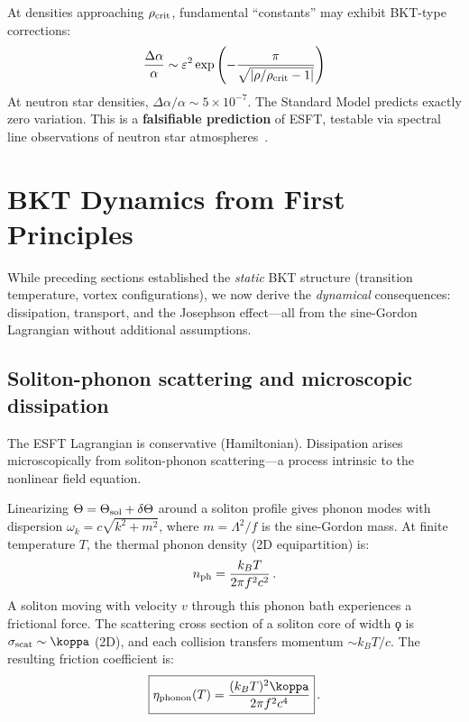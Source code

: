 ﻿\documentclass[twocolumn,showpacs,preprintnumbers,amsmath,amssymb,prd]{revtex4-2}
\begin{document}
At densities approaching $\rho_{\rm crit}$, fundamental ``constants'' may exhibit BKT-type corrections:
\begin{equation}
\frac{\Delta\alpha}{\alpha} \sim \varepsilon^2 \exp\left(-\frac{\pi}{\sqrt{|\rho/\rho_{\rm crit} - 1|}}\right)
\label{eq:dalpha}
\end{equation}
At neutron star densities, $\Delta\alpha/\alpha \sim 5 \times 10^{-7}$. The Standard Model predicts exactly zero variation. This is a \textbf{falsifiable prediction} of ESFT, testable via spectral line observations of neutron star atmospheres~\cite{Cottam2002}.

\section{BKT Dynamics from First Principles}
\label{sec:dynamics}

While preceding sections established the \emph{static} BKT structure (transition temperature, vortex configurations), we now derive the \emph{dynamical} consequences: dissipation, transport, and the Josephson effect---all from the sine-Gordon Lagrangian without additional assumptions.

\subsection{Soliton-phonon scattering and microscopic dissipation}
\label{sec:dissipation}

The ESFT Lagrangian is conservative (Hamiltonian). Dissipation arises microscopically from soliton-phonon scattering---a process intrinsic to the nonlinear field equation.

Linearizing $\Theta = \Theta_{\rm sol} + \delta\Theta$ around a soliton profile gives phonon modes with dispersion $\omega_k = c\sqrt{k^2 + m^2}$, where $m = \Lambda^2/f$ is the sine-Gordon mass. At finite temperature $T$, the thermal phonon density (2D equipartition) is:
\begin{equation}
n_{\rm ph} = \frac{k_B T}{2\pi f^2 c^2}\,.
\label{eq:n_phonon}
\end{equation}
A soliton moving with velocity $v$ through this phonon bath experiences a frictional force. The scattering cross section of a soliton core of width $\koppa$ is $\sigma_{\rm scat} \sim \koppa$ (2D), and each collision transfers momentum $\sim k_B T/c$. The resulting friction coefficient is:
\begin{equation}
\boxed{\eta_{\rm phonon}(T) = \frac{(k_B T)^2 \koppa}{2\pi f^2 c^4}}\,.
\label{eq:eta_phonon}
\end{equation}
\end{document}
